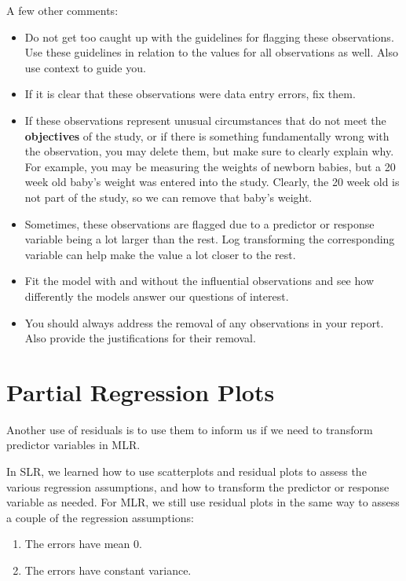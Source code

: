 \documentclass[
]{book}
\providecommand{\tightlist}{%
  \setlength{\itemsep}{0pt}\setlength{\parskip}{0pt}}
\begin{document}
A few other comments:

\begin{itemize}
\tightlist
\item
  Do not get too caught up with the guidelines for flagging these observations. Use these guidelines in relation to the values for all observations as well. Also use context to guide you.
\item
  If it is clear that these observations were data entry errors, fix them.
\item
  If these observations represent unusual circumstances that do not meet the \textbf{objectives} of the study, or if there is something fundamentally wrong with the observation, you may delete them, but make sure to clearly explain why. For example, you may be measuring the weights of newborn babies, but a 20 week old baby's weight was entered into the study. Clearly, the 20 week old is not part of the study, so we can remove that baby's weight.
\item
  Sometimes, these observations are flagged due to a predictor or response variable being a lot larger than the rest. Log transforming the corresponding variable can help make the value a lot closer to the rest.
\item
  Fit the model with and without the influential observations and see how differently the models answer our questions of interest.
\item
  You should always address the removal of any observations in your report. Also provide the justifications for their removal.
\end{itemize}

\hypertarget{partial-regression-plots}{%
\section{Partial Regression Plots}\label{partial-regression-plots}}

Another use of residuals is to use them to inform us if we need to transform predictor variables in MLR.

In SLR, we learned how to use scatterplots and residual plots to assess the various regression assumptions, and how to transform the predictor or response variable as needed. For MLR, we still use residual plots in the same way to assess a couple of the regression assumptions:

\begin{enumerate}
\def\labelenumi{\arabic{enumi}.}
\tightlist
\item
  The errors have mean 0.
\item
  The errors have constant variance.
\end{enumerate}
\end{document}
